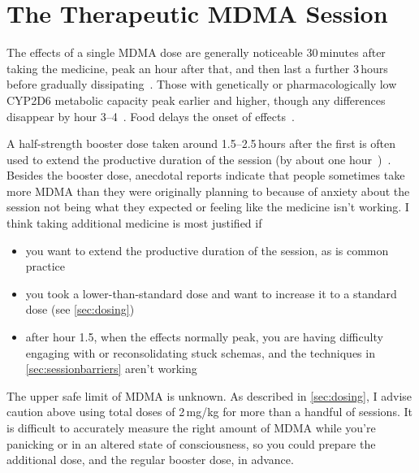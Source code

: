 \documentclass[11pt,oneside]{book}
\let\cite\parencite
\begin{document}

\section{The Therapeutic MDMA Session}
\label{session}
The effects of a single MDMA dose are generally noticeable 30\,minutes after taking the medicine, peak an hour after that, and then last a further 3\,hours before gradually dissipating~\cite{vizeliActuteEffects}. Those with genetically or pharmacologically low CYP2D6 metabolic capacity peak earlier and higher, though any differences disappear by hour 3--4~\cite{schmid2016cyp2d6}. Food delays the onset of effects~\cite{MithoeferMDMA}.

A half-strength booster dose taken around 1.5--2.5\,hours after the first is often used to extend the productive duration of the session (by about one hour~\cite{humbert-drozComparisonAcuteEffects2026})~\cite{mitchellMDMAClinicalTrial2}. Besides the booster dose, anecdotal reports indicate that people sometimes take more MDMA than they were originally planning to because of anxiety about the session not being what they expected or feeling like the medicine isn't working. I think taking additional medicine is most justified if
\begin{itemize}
    \item you want to extend the productive duration of the session, as is common practice
    \item you took a lower-than-standard dose and want to increase it to a standard dose (see \cref{sec:dosing})
    \item after hour 1.5, when the effects normally peak, you are having difficulty engaging with or reconsolidating stuck schemas, and the techniques in \cref{sec:sessionbarriers} aren't working
\end{itemize}
The upper safe limit of MDMA is unknown. As described in \cref{sec:dosing}, I advise caution above using total doses of 2\,mg/kg for more than a handful of sessions. It is difficult to accurately measure the right amount of MDMA while you're panicking or in an altered state of consciousness, so you could prepare the additional dose, and the regular booster dose, in advance.
\end{document}
